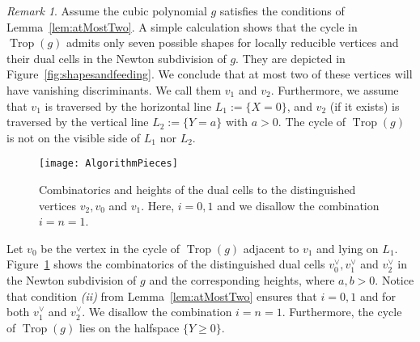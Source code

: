 \documentclass[11pt]{amsart}
\numberwithin{equation}{section}
\theoremstyle{plain}
\theoremstyle{definition}
\theoremstyle{remark}
\newtheorem{remark}[theorem]{Remark}
\begin{document}
\begin{remark}\label{rem-v0v1v2}
  Assume the cubic polynomial $g$ satisfies the conditions of
  Lemma~\ref{lem:atMostTwo}. A simple calculation shows that the cycle
  in $\operatorname{Trop}(g)$ admits only seven possible shapes for locally
  reducible vertices and their dual cells in the Newton subdivision of
  $g$. They are depicted in Figure~\ref{fig:shapesandfeeding}. We
  conclude that at most two of these vertices will have vanishing
  discriminants. We call them $v_1$ and $v_2$. Furthermore, we assume
  that $v_1$ is traversed by the horizontal line $L_1:=\{X=0\}$, and
  $v_2$ (if it exists) is traversed by the vertical line
  $L_2:=\{Y=a\}$ with $a>0$. The cycle of $\operatorname{Trop}(g)$ is not on the
  visible side of $L_1$ nor $L_2$.

  \begin{figure}[tb]
    \centering
    \texttt{[image: AlgorithmPieces]}
    \caption{Combinatorics and heights of the dual cells to the
      distinguished vertices $v_2,v_0$ and $v_1$. Here, $i=0,1$ and we
      disallow the combination $i=n=1$.}
    \label{fig:figuresAlgorithm}
  \end{figure}

  Let $v_0$ be the vertex in the cycle of $\operatorname{Trop}(g)$ adjacent to $v_1$
  and lying on $L_1$. Figure~\ref{fig:figuresAlgorithm} shows the
  combinatorics of the distinguished dual cells
  $v_0^{\vee},v_1^{\vee}$ and $v_2^{\vee}$ in the Newton subdivision
  of $g$ and the corresponding heights, where $a,b>0$.  Notice that
  condition \emph{(ii)} from Lemma~\ref{lem:atMostTwo} ensures that
  $i=0,1$ and for both $v_1^{\vee}$ and $v_2^{\vee}$. We disallow the
  combination $i=n=1$. Furthermore, the cycle of $\operatorname{Trop}(g)$ lies on
  the halfspace $\{Y \geq 0\}$.

\end{remark}
\end{document}
